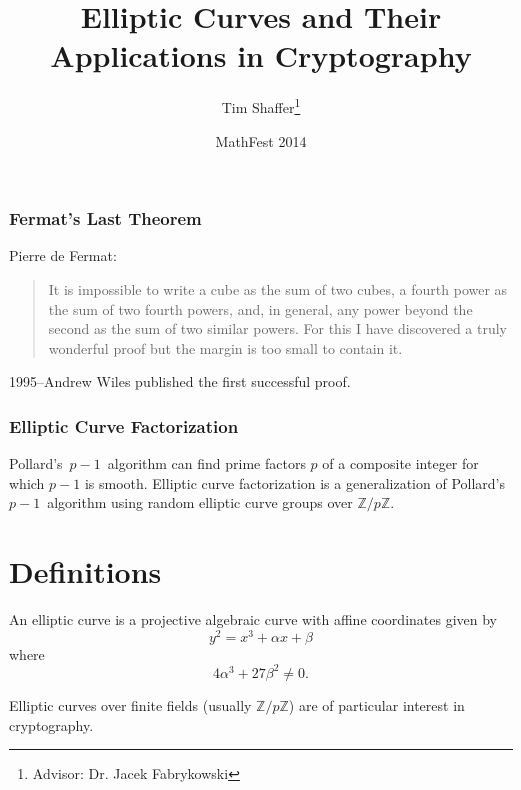 \documentclass{beamer}
\title[Elliptic Curve Cryptography]{Elliptic Curves and
    Their Applications in Cryptography}
\author{Tim Shaffer\thanks{Advisor: Dr. Jacek Fabrykowski}}
\institute[YSU]{Youngstown State University}
\date{MathFest 2014}
\newcommand{\zmod}[1]{\ensuremath{\mathbb{Z}/#1\mathbb{Z}}}
\begin{document}
    \frenchspacing
    \frame{\maketitle}

    \begin{frame}
        \frametitle{Fermat's Last Theorem}
        Pierre de Fermat: %
        \begin{quote}
            It is impossible to write a cube as the sum of two cubes, a fourth
            power as the sum of two fourth powers, and, in general, any power
            beyond the second as the sum of two similar powers. For this I
            have discovered a truly wonderful proof but the margin is too
            small to contain it.
        \end{quote}
        \vfill
        1995--Andrew Wiles published the first successful proof.
    \end{frame}

    \begin{frame}
        \frametitle{Elliptic Curve Factorization}
        Pollard's~\(p - 1\)~algorithm can find prime factors \(p\) of a
        composite integer for which \(p - 1\) is smooth. %
        \vfill
        Elliptic curve factorization is a generalization of
        Pollard's~\(p - 1\)~algorithm using random elliptic curve groups
        over \zmod{p}.
    \end{frame}

    \section{Definitions}
    \begin{frame}
        \begin{definition}
            An elliptic curve is a projective algebraic curve with
            affine coordinates given by \[y^2 = x^3 + \alpha x + \beta\]
            where \[4\alpha^3 + 27\beta^2 \neq 0.\]
        \end{definition}
        \vfill
        Elliptic curves over finite fields (usually \zmod{p}) are of
        particular interest in cryptography.
    \end{frame}
\end{document}
